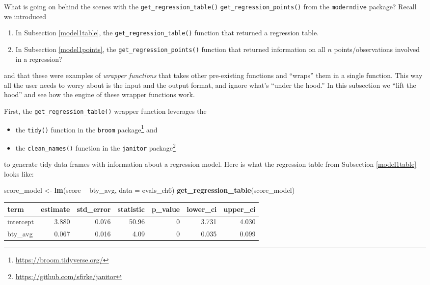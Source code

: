 \documentclass[12pt,]{krantz}
\makeatletter
\newenvironment{Shaded}{\begin{snugshade}}{\end{snugshade}}
\newcommand{\KeywordTok}[1]{\textcolor[rgb]{0.27,0.27,0.27}{\textbf{#1}}}
\newcommand{\DataTypeTok}[1]{\textcolor[rgb]{0.27,0.27,0.27}{#1}}
\newcommand{\StringTok}[1]{\textcolor[rgb]{0.5,0.5,0.5}{#1}}
\newcommand{\OperatorTok}[1]{\textcolor[rgb]{0.43,0.43,0.43}{\textbf{#1}}}
\newcommand{\NormalTok}[1]{#1}
\providecommand{\tightlist}{%
  \setlength{\itemsep}{0pt}\setlength{\parskip}{0pt}}
\renewcommand{\href}[2]{#2\footnote{\url{#1}}}
\newenvironment{kframe}{%
\medskip{}
\setlength{\fboxsep}{.8em}
 \def\at@end@of@kframe{}%
 \ifinner\ifhmode%
  \def\at@end@of@kframe{\end{minipage}}%
  \begin{minipage}{\columnwidth}%
 \fi\fi%
 \def\FrameCommand##1{\hskip\@totalleftmargin \hskip-\fboxsep
 \colorbox{shadecolor}{##1}\hskip-\fboxsep
     \hskip-\linewidth \hskip-\@totalleftmargin \hskip\columnwidth}%
 \MakeFramed {\advance\hsize-\width
   \@totalleftmargin\z@ \linewidth\hsize
   \@setminipage}}%
 {\par\unskip\endMakeFramed%
 \at@end@of@kframe}
\renewenvironment{Shaded}{\begin{kframe}}{\end{kframe}}
\theoremstyle{definition}
\theoremstyle{definition}
\theoremstyle{definition}
\theoremstyle{remark}
\makeatother
\begin{document}
What is going on behind the scenes with the
\texttt{get\_regression\_table()} \texttt{get\_regression\_points()}
from the \texttt{moderndive} package? Recall we introduced

\begin{enumerate}
\def\labelenumi{\arabic{enumi}.}
\tightlist
\item
  In Subsection \ref{model1table}, the \texttt{get\_regression\_table()}
  function that returned a regression table.
\item
  In Subsection \ref{model1points}, the
  \texttt{get\_regression\_points()} function that returned information
  on all \(n\) points/observations involved in a regression?
\end{enumerate}

and that these were examples of \emph{wrapper functions} that takes
other pre-existing functions and ``wraps'' them in a single function.
This way all the user needs to worry about is the input and the output
format, and ignore what's ``under the hood.'' In this subsection we
``lift the hood'' and see how the engine of these wrapper functions
work.

First, the \texttt{get\_regression\_table()} wrapper function leverages
the

\begin{itemize}
\tightlist
\item
  the \texttt{tidy()} function in the
  \href{https://broom.tidyverse.org/}{\texttt{broom} package} and
\item
  the \texttt{clean\_names()} function in the
  \href{https://github.com/sfirke/janitor}{\texttt{janitor} package}
\end{itemize}

to generate tidy data frames with information about a regression model.
Here is what the regression table from Subsection \ref{model1table}
looks like:

\begin{Shaded}
\begin{Highlighting}[]
\NormalTok{score_model <-}\StringTok{ }\KeywordTok{lm}\NormalTok{(score }\OperatorTok{~}\StringTok{ }\NormalTok{bty_avg, }\DataTypeTok{data =}\NormalTok{ evals_ch6)}
\KeywordTok{get_regression_table}\NormalTok{(score_model)}
\end{Highlighting}
\end{Shaded}

\begin{table}[H]
\centering\begingroup\fontsize{10}{12}\selectfont

\begin{tabular}{l|r|r|r|r|r|r}
\hline
term & estimate & std\_error & statistic & p\_value & lower\_ci & upper\_ci\\
\hline
intercept & 3.880 & 0.076 & 50.96 & 0 & 3.731 & 4.030\\
\hline
bty\_avg & 0.067 & 0.016 & 4.09 & 0 & 0.035 & 0.099\\
\hline
\end{tabular}\endgroup{}
\end{table}
\end{document}
